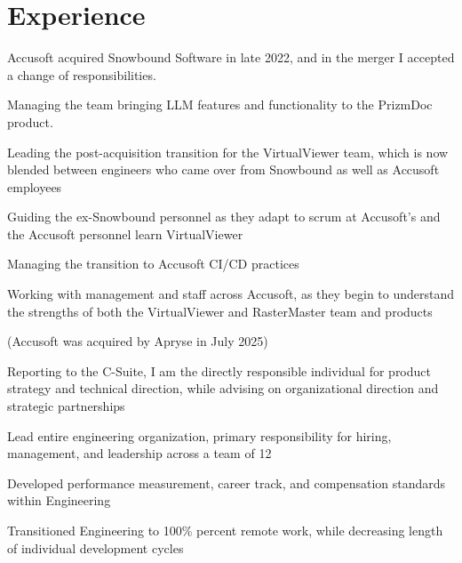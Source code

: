 \documentclass[letterpaper,10pt]{article}
\begin{document}

  \section{Experience}

  \begin{resume_list}
    \item Accusoft acquired Snowbound Software in late 2022, and in the merger I accepted a change of responsibilities.
    \item Managing the team bringing LLM features and functionality to the PrizmDoc product.
    \item Leading the post-acquisition transition for the VirtualViewer team, which is now blended between engineers who came over from Snowbound as well as Accusoft employees
    \item Guiding the ex-Snowbound personnel as they adapt to scrum at Accusoft's and the Accusoft personnel learn VirtualViewer
    \item Managing the transition to Accusoft CI/CD practices
    \item Working with management and staff across Accusoft, as they begin to understand the strengths of both the VirtualViewer and RasterMaster team and products
    \item (Accusoft was acquired by Apryse in July 2025)
  \end{resume_list}

  \begin{resume_list}
    \item Reporting to the C-Suite, I am the directly responsible individual for product strategy and technical direction, while advising on organizational direction and strategic partnerships
    \item Lead entire engineering organization, primary responsibility for hiring, management, and leadership across a team of 12
    \item Developed performance measurement, career track, and compensation standards within Engineering
    \item Transitioned Engineering to 100\% percent remote work, while decreasing length of individual development cycles
  \end{resume_list}
     
\end{document}

